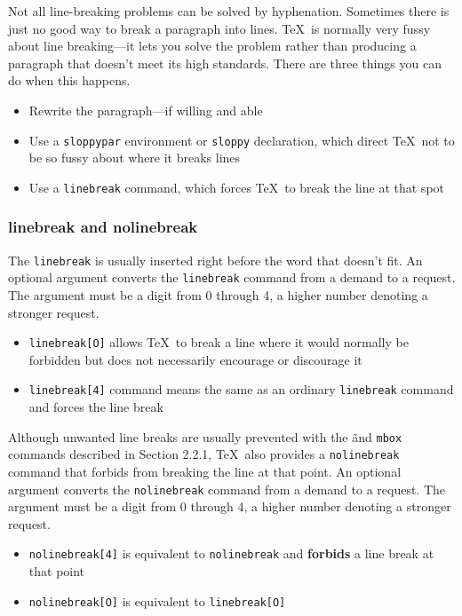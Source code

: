 \documentclass{article}
\begin{document}
Not all line-breaking problems can be solved by hyphenation. Sometimes there is just no good way to
break a paragraph into lines. \TeX\ is normally very fussy about line breaking---it lets you solve
the problem rather than producing a paragraph that doesn't meet its high standards. There are three
things you can do when this happens.

\begin{itemize}
   \item Rewrite the paragraph---if willing and able
   \item Use a {\tt sloppypar} environment or \verb:sloppy: declaration, which direct \TeX\ not
    to be so fussy about where it breaks lines
   \item Use a \verb:linebreak: command, which forces \TeX\ to break the line at that spot
\end{itemize}

\subsubsection{linebreak and nolinebreak}

The \verb:linebreak: is usually inserted right before the word that doesn't fit. An optional argument converts the \verb:linebreak: command from a demand to a request. The argument must be a digit from 0 through 4, a higher number denoting a stronger request. 

\begin{itemize}
   
   \item \verb:linebreak[O]: allows \TeX\ to break a line where it would normally be forbidden but does not necessarily encourage or discourage it
   
   \item \verb:linebreak[4]: command means the same as an ordinary \verb:linebreak: command and forces the line break
        
\end{itemize}
 
Although unwanted line breaks are usually prevented with the \~ and \verb:mbox: commands described
in Section 2.2.1, \TeX\ also provides a \verb:nolinebreak: command that forbids from breaking the
line at that point. An optional argument converts the \verb:nolinebreak: command from a demand to a
request. The argument must be a digit from 0 through 4, a higher number denoting a stronger
request.

\begin{itemize}
   
   \item \verb:nolinebreak[4]: is equivalent to \verb:nolinebreak: and \textbf{forbids} a line break at that point
   
   \item \verb:nolinebreak[O]: is equivalent to \verb:linebreak[O]:
\end{itemize}
\end{document}
